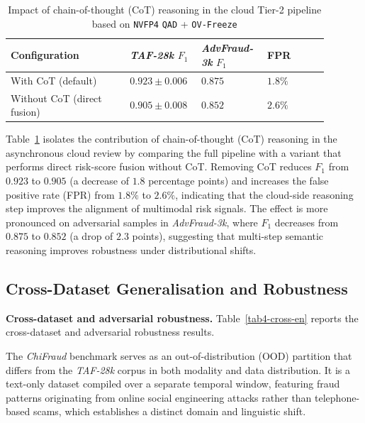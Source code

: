 \documentclass[a4paper,fleqn]{cas-sc}
\begin{document}
\begin{table}[t]
\centering
\caption{Impact of chain-of-thought (CoT) reasoning in the cloud Tier-2 pipeline based on \texttt{NVFP4} \texttt{QAD} + \texttt{OV-Freeze}}
\label{tab:cot-ablation-en}
\small
\renewcommand{\arraystretch}{1.1}
\begin{tabular}{>{\raggedright\arraybackslash}p{0.35\linewidth}>{\centering\arraybackslash}p{0.18\linewidth}>{\centering\arraybackslash}p{0.18\linewidth}>{\centering\arraybackslash}p{0.18\linewidth}}
\toprule
\textbf{Configuration} &
\textbf{\textit{TAF-28k} $F_1$} &
\textbf{\textit{AdvFraud-3k} $F_1$} &
\textbf{FPR} \\
\midrule
With CoT (default)
& $\mathbf{0.923 \pm 0.006}$
& $\mathbf{0.875}$
& $\mathbf{1.8\%}$ \\

Without CoT (direct fusion)
& $0.905 \pm 0.008$
& $0.852$
& $2.6\%$ \\
\bottomrule
\end{tabular}
\end{table}

Table~\ref{tab:cot-ablation-en} isolates the contribution of chain-of-thought (CoT) reasoning in the asynchronous cloud review by comparing the full pipeline with a variant that performs direct risk-score fusion without CoT.
Removing CoT reduces $F_1$ from $0.923$ to $0.905$ (a decrease of $1.8$ percentage points) and increases the false positive rate (FPR) from $1.8\%$ to $2.6\%$, indicating that the cloud-side reasoning step improves the alignment of multimodal risk signals.
The effect is more pronounced on adversarial samples in \textit{AdvFraud-3k}, where $F_1$ decreases from $0.875$ to $0.852$ (a drop of $2.3$ points), suggesting that multi-step semantic reasoning improves robustness under distributional shifts.

\subsection{Cross-Dataset Generalisation and Robustness}\label{sec:crossdata}

\medskip
\noindent\textbf{Cross-dataset and adversarial robustness.}
Table~\ref{tab4-cross-en} reports the cross-dataset and adversarial robustness results.

The \textit{ChiFraud} benchmark serves as an out-of-distribution (OOD) partition that differs from the \textit{TAF-28k} corpus in both modality and data distribution. It is a text-only dataset compiled over a separate temporal window, featuring fraud patterns originating from online social engineering attacks rather than telephone-based scams, which establishes a distinct domain and linguistic shift.
\end{document}
